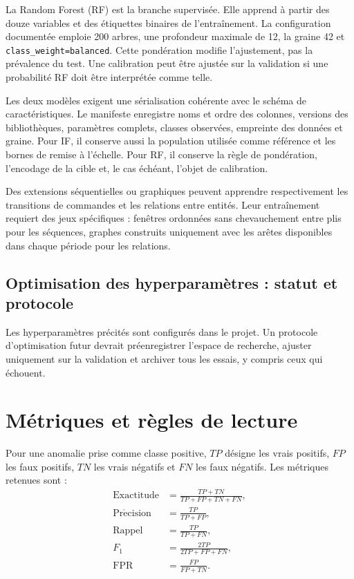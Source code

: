 \documentclass[11pt,a4paper,oneside]{report}
\theoremstyle{definition}
\theoremstyle{plain}
\begin{document}
La Random Forest (RF) est la branche supervisée. Elle apprend à partir des
douze variables et des étiquettes binaires de l'entraînement. La configuration
documentée emploie 200 arbres, une profondeur maximale de 12, la graine 42 et
\texttt{class\_weight=balanced}. Cette pondération modifie l'ajustement, pas la
prévalence du test. Une calibration peut être ajustée sur la validation si une
probabilité RF doit être interprétée comme telle.

Les deux modèles exigent une sérialisation cohérente avec le schéma de
caractéristiques. Le manifeste enregistre noms et ordre des colonnes, versions
des bibliothèques, paramètres complets, classes observées, empreinte des
données et graine. Pour IF, il conserve aussi la population utilisée comme
référence et les bornes de remise à l'échelle. Pour RF, il conserve la règle de
pondération, l'encodage de la cible et, le cas échéant, l'objet de calibration.

Des extensions séquentielles ou graphiques peuvent apprendre respectivement les
transitions de commandes et les relations entre entités. Leur entraînement
requiert des jeux spécifiques : fenêtres ordonnées sans chevauchement entre
plis pour les séquences, graphes construits uniquement avec les arêtes
disponibles dans chaque période pour les relations.

\subsection{Optimisation des hyperparamètres : statut et protocole}

Les hyperparamètres précités sont configurés dans le projet. Un protocole
d'optimisation futur devrait préenregistrer l'espace de recherche, ajuster
uniquement sur la validation et archiver tous les essais, y compris ceux qui
échouent.

\section{Métriques et règles de lecture}
\label{sec:eval-metrics}

Pour une anomalie prise comme classe positive, $TP$ désigne les vrais positifs,
$FP$ les faux positifs, $TN$ les vrais négatifs et $FN$ les faux négatifs. Les
métriques retenues sont :
\begin{align}
\mathrm{Exactitude}
  &=\frac{TP+TN}{TP+FP+TN+FN},\\
\mathrm{Pr\acute{e}cision}
  &=\frac{TP}{TP+FP},\\
\mathrm{Rappel}
  &=\frac{TP}{TP+FN},\\
F_1
  &=\frac{2TP}{2TP+FP+FN},\\
\mathrm{FPR}
  &=\frac{FP}{FP+TN}.
\end{align}
\end{document}
